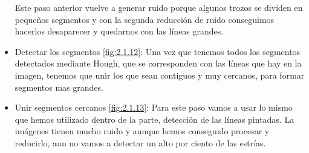\begin{itemize}
Este paso anterior vuelve a generar ruido porque algunos trozos se dividen en pequeños segmentos y con la segunda reducción de ruido conseguimos hacerlos desaparecer y quedarnos con las líneas grandes.
	\item Detectar los segmentos \ref{fig:2.1.12}:
Una vez que tenemos todos los segmentos detectados mediante Hough, que se corresponden con las líneas que hay en la imagen, tenemos que unir los que sean contiguos y muy cercanos, para formar segmentos mas grandes.
	\item Unir segmentos cercanos \ref{fig:2.1.13}:
Para este paso vamos a usar lo mismo que hemos utilizado dentro de la parte, detección de las líneas pintadas.
La imágenes tienen mucho ruido y aunque hemos conseguido procesar y reducirlo, aun no vamos a detectar un alto por ciento de las estrías.
\end{itemize}



